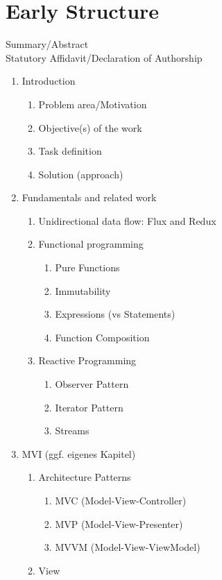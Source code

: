 \section{Early Structure}
\label{sec:early-structure}

\quad Summary/Abstract
\\
\quad Statutory Affidavit/Declaration of Authorship
\begin{enumerate}
	\item Introduction
	\begin{enumerate}
		\item Problem area/Motivation
		\item Objective(s) of the work
		\item Task definition
		\item Solution (approach)
	\end{enumerate}
	\item Fundamentals and related work
	\begin{enumerate}
		\item Unidirectional data flow: Flux and Redux
		\item Functional programming
		\begin{enumerate}
			\item Pure Functions
			\item Immutability
			\item Expressions (vs Statements)
			\item Function Composition
		\end{enumerate}
		\item Reactive Programming
		\begin{enumerate}
			\item Observer Pattern
			\item Iterator Pattern
			\item Streams
		\end{enumerate}
	\end{enumerate}
	\item MVI (ggf. eigenes Kapitel)
		\begin{enumerate}
			\item Architecture Patterns
			\begin{enumerate}
				\item MVC (Model-View-Controller)
				\item MVP (Model-View-Presenter)
				\item MVVM (Model-View-ViewModel)
			\end{enumerate}
			\item View

\end{enumerate}
\end{enumerate}
